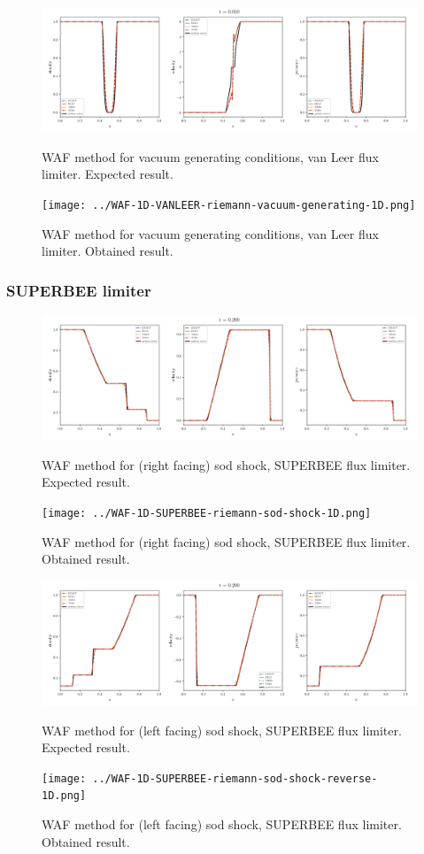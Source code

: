     \begin{figure}[htbp]
        \centering
        \includegraphics[width=.9\textwidth]{./figures/WAF-1D-VANLEER-riemann-vacuum-generating-1D.png}%
        \caption{WAF method for vacuum generating conditions, van Leer flux limiter. Expected result.}
        \texttt{[image: ../WAF-1D-VANLEER-riemann-vacuum-generating-1D.png]}%
        \caption{WAF method for vacuum generating conditions, van Leer flux limiter. Obtained result.}
    \end{figure}






\clearpage
\subsubsection{SUPERBEE limiter}

    \begin{figure}[htbp]
        \centering
        \includegraphics[width=.9\textwidth]{./figures/WAF-1D-SUPERBEE-riemann-sod-shock-1D.png}%
        \caption{WAF method for (right facing) sod shock, SUPERBEE flux limiter. Expected result.}
        \texttt{[image: ../WAF-1D-SUPERBEE-riemann-sod-shock-1D.png]}%
        \caption{WAF method for (right facing) sod shock, SUPERBEE flux limiter. Obtained result.}
    \end{figure}


    \begin{figure}[htbp]
        \centering
        \includegraphics[width=.9\textwidth]{./figures/WAF-1D-SUPERBEE-riemann-sod-shock-reverse-1D.png}%
        \caption{WAF method for (left facing) sod shock, SUPERBEE flux limiter. Expected result.}
        \texttt{[image: ../WAF-1D-SUPERBEE-riemann-sod-shock-reverse-1D.png]}%
        \caption{WAF method for (left facing) sod shock, SUPERBEE flux limiter. Obtained result.}
    \end{figure}



